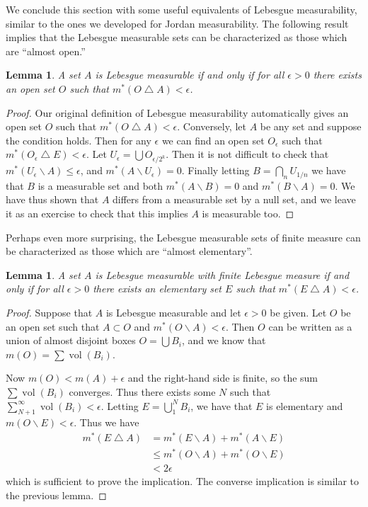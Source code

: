 \documentclass[10pt,oneside]{amsbook}
\renewcommand{\setminus}{\smallsetminus}
\renewcommand{\triangle}{\bigtriangleup}
\DeclareMathOperator{\vol}{vol}
\theoremstyle{definition}
\theoremstyle{plain}
\newtheorem{lem}[thm]{Lemma}
\theoremstyle{definition}
\theoremstyle{remark}
\numberwithin{equation}{section}
\numberwithin{figure}{section}
\begin{document}
We conclude this section with some useful equivalents of Lebesgue measurability, similar to the ones we developed for Jordan measurability. The following result implies that the Lebesgue measurable sets can be characterized as those which are ``almost open.''

\begin{lem}
  A set $A$ is Lebesgue measurable if and only if for all $\epsilon>0$ there exists an open set $O$ such that $m^*(O\triangle A)<\epsilon$.
\end{lem}

\begin{proof}
  Our original definition of Lebesgue measurability automatically gives an open set $O$ such that $m^*(O\triangle A)<\epsilon$. Conversely, let $A$ be any set and suppose the condition holds. Then for any $\epsilon$ we can find an open set $O_\epsilon$ such that $m^*(O_\epsilon\triangle E)<\epsilon$. Let $U_\epsilon=\bigcup O_{\epsilon/2^k}$. Then it is not difficult to check that $m^*(U_\epsilon\setminus A)\leq\epsilon$, and $m^*(A\setminus U_\epsilon)=0$. Finally letting $B=\bigcap_nU_{1/n}$ we have that $B$ is a measurable set and both $m^*(A\setminus B)=0$ and $m^*(B\smallsetminus A)=0$. We have thus shown that $A$ differs from a measurable set by a null set, and we leave it as an exercise to check that this implies $A$ is measurable too.
\end{proof}

Perhaps even more surprising, the Lebesgue measurable sets of finite measure can be characterized as those which are ``almost elementary''.

\begin{lem}
  A set $A$ is Lebesgue measurable with finite Lebesgue measure if and only if for all $\epsilon>0$ there exists an elementary set $E$ such that $m^*(E\triangle A)<\epsilon$.
\end{lem}

\begin{proof}
  Suppose that $A$ is Lebesgue measurable and let $\epsilon>0$ be given. Let $O$ be an open set such that $A\subset O$ and $m^*(O\setminus A)<\epsilon$. Then $O$ can be written as a union of almost disjoint boxes $O=\bigcup B_i$, and we know that $m(O)=\sum\vol(B_i)$.

  Now $m(O)<m(A)+\epsilon$ and the right-hand side is finite, so the sum $\sum\vol(B_i)$ converges. Thus there exists some $N$ such that $\sum_{N+1}^\infty\vol(B_i)<\epsilon$. Letting $E=\bigcup_1^N B_i$, we have that $E$ is elementary and $m(O\setminus E)<\epsilon$. Thus we have
  \begin{align*}
    m^*(E\triangle A)&=m^*(E\setminus A)+m^*(A\setminus E)\\
                     &\leq m^*(O\setminus A)+m^*(O\setminus E)\\
                     &<2\epsilon
  \end{align*}
  which is sufficient to prove the implication. The converse implication is similar to the previous lemma.
\end{proof}
\end{document}
